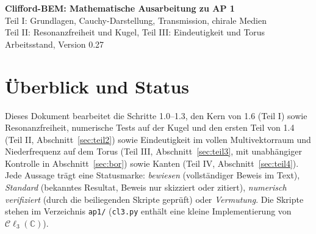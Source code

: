 \documentclass[11pt, a4paper]{article}
\newcommand{\clc}{\mathcal{C}\ell_{3}(\mathbb{C})}
\theoremstyle{plain}
\theoremstyle{definition}
\begin{document}
\begin{center}
  \sffamily
  {\Large\textbf{Clifford-BEM: Mathematische Ausarbeitung zu AP 1}}\\[0.3cm]
  {\large Teil I: Grundlagen, Cauchy-Darstellung, Transmission, chirale Medien\\
  Teil II: Resonanzfreiheit und Kugel, Teil III: Eindeutigkeit und Torus}\\[0.3cm]
  {\small Arbeitsstand, Version 0.27}
\end{center}

\section*{Überblick und Status}

Dieses Dokument bearbeitet die Schritte 1.0--1.3, den Kern von 1.6 (Teil I)
sowie Resonanzfreiheit, numerische Tests auf der Kugel und den ersten Teil von
1.4 (Teil II, Abschnitt~\ref{sec:teil2}) sowie Eindeutigkeit im vollen
Multivektorraum und Niederfrequenz auf dem Torus (Teil III, Abschnitt~\ref{sec:teil3},
mit unabhängiger Kontrolle in Abschnitt~\ref{sec:bor}) sowie Kanten
(Teil IV, Abschnitt~\ref{sec:teil4}). Jede Aussage trägt eine Statusmarke: \emph{bewiesen} (vollständiger
Beweis im Text), \emph{Standard} (bekanntes Resultat, Beweis nur skizziert oder
zitiert), \emph{numerisch verifiziert} (durch die beiliegenden Skripte geprüft)
oder \emph{Vermutung}. Die Skripte stehen im Verzeichnis \texttt{ap1/}
(\texttt{cl3.py} enthält eine kleine Implementierung von $\clc$).
\end{document}
